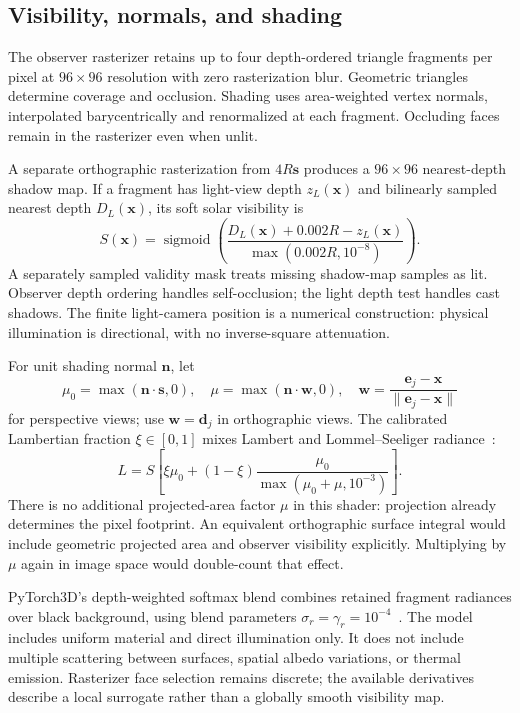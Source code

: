 \documentclass[10pt,a4paper]{article}
\newcommand{\vect}[1]{\bm{#1}}
\newcommand{\sigmoid}{\operatorname{sigmoid}}
\begin{document}
\subsection{Visibility, normals, and shading}
The observer rasterizer retains up to four depth-ordered triangle
fragments per pixel at $96\times96$ resolution with zero rasterization
blur. Geometric triangles determine coverage and occlusion. Shading uses
area-weighted vertex normals, interpolated barycentrically and renormalized
at each fragment. Occluding faces remain in the rasterizer even when unlit.

A separate orthographic rasterization from $4R\vect s$ produces a
$96\times96$ nearest-depth shadow map. If a fragment has light-view depth
$z_L(\vect x)$ and bilinearly sampled nearest depth $D_L(\vect x)$, its
soft solar visibility is
\begin{equation}
 S(\vect x)=\sigmoid\!\left(
 \frac{D_L(\vect x)+0.002R-z_L(\vect x)}{\max(0.002R,10^{-8})}\right).
\end{equation}
A separately sampled validity mask treats missing shadow-map samples as
lit. Observer depth ordering handles self-occlusion; the light depth test
handles cast shadows. The finite light-camera position is a numerical
construction: physical illumination is directional, with no inverse-square
attenuation.

For unit shading normal $\vect n$, let
\begin{equation}
 \mu_0=\max(\vect n\cdot\vect s,0),\quad
 \mu=\max(\vect n\cdot\vect w,0),\quad
 \vect w=\frac{\vect e_j-\vect x}{\|\vect e_j-\vect x\|}
\end{equation}
for perspective views; use $\vect w=\vect d_j$ in orthographic views.
The calibrated Lambertian fraction $\xi\in[0,1]$ mixes Lambert and
Lommel--Seeliger radiance~\cite{lommel}:
\begin{equation}
 L=S\left[\xi\mu_0+(1-\xi)\frac{\mu_0}{\max(\mu_0+\mu,10^{-3})}\right].
 \label{eq:scattering}
\end{equation}
There is no additional projected-area factor $\mu$ in this shader:
projection already determines the pixel footprint. An equivalent
orthographic surface integral would include geometric projected area
and observer visibility explicitly. Multiplying by $\mu$ again in image
space would double-count that effect.

PyTorch3D's depth-weighted softmax blend combines retained fragment
radiances over black background, using blend parameters
$\sigma_r=\gamma_r=10^{-4}$~\cite{pytorch3d}. The model includes uniform
material and direct illumination only. It does not include multiple
scattering between surfaces, spatial albedo variations, or thermal emission.
Rasterizer face selection remains discrete; the available derivatives
describe a local surrogate rather than a globally smooth visibility map.
\end{document}
